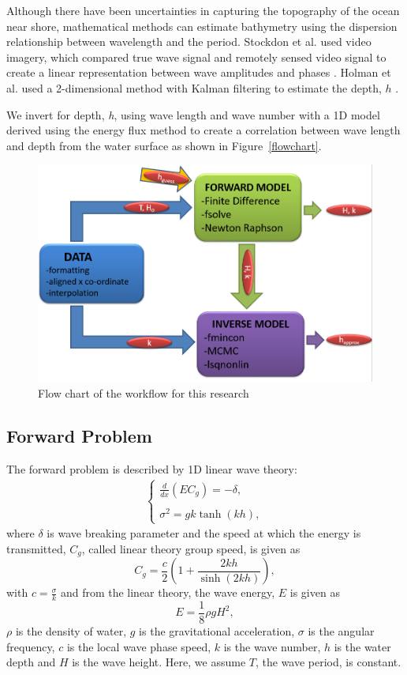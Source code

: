 
Although there have been uncertainties in capturing the topography of the ocean near shore, mathematical methods can estimate bathymetry using the dispersion relationship between wavelength and the period. Stockdon et al. used video imagery, which compared true wave signal and remotely sensed video signal to create a linear representation between wave amplitudes and phases \citep{stockdon2000}.  Holman et al. used a 2-dimensional method with Kalman filtering to estimate the depth, $h$ \citep{holman2013}.

We invert for depth, \textit{h}, using wave length and wave number with a 1D model derived using the energy flux method to create a correlation between wave length and depth from the water surface as shown in Figure~\ref{flowchart}.

\begin{figure}[h]
		\centering
		\includegraphics[width=.40\linewidth]{img/Flow_Chart.png}
		\caption{Flow chart of the workflow for this research}
		\label{AWAC}
\end{figure}

\subsection{Forward Problem}\label{forwardproblem}
The forward problem is described by 1D linear wave theory:
\begin{eqnarray}
\label{fp1}
\left \{
\begin{array}{lll}
\frac{d}{dx}\left(EC_g\right)=-\delta,\\
\\
\sigma^2=gk\tanh(kh),
\label{ode}
\end{array}
\right.
\end{eqnarray}
where $\delta$ is  wave breaking parameter and the speed at which the energy is transmitted, $C_g$, called linear theory group speed, is given as
\begin{equation}
\label{cg}
C_g=\frac{c}{2}\left(1+\frac{2kh}{\sinh(2kh)}\right),
\end{equation}
with $c=\frac{\sigma}{k}$ and from the linear theory, the wave energy, $E$ is given as
\begin{equation}
\label{e}
E=\frac{1}{8}\rho g H^2,
\end{equation}
$\rho$ is the density of water, $g$ is the gravitational acceleration, $\sigma$ is the angular frequency, $c$ is the local wave phase speed, $k$ is the wave number, $h$ is the water depth and $H$ is the wave height. Here, we assume $T$, the wave period, is constant.\\ 

